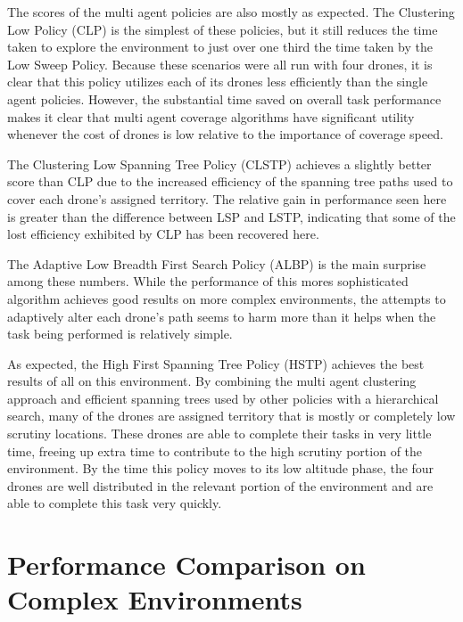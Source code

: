 The scores of the multi agent policies are also mostly as expected. The Clustering Low Policy (CLP) is the simplest of these policies, but it still reduces the time taken to explore the environment to just over one third the time taken by the Low Sweep Policy. Because these scenarios were all run with four drones, it is clear that this policy utilizes each of its drones less efficiently than the single agent policies. However, the substantial time saved on overall task performance makes it clear that multi agent coverage algorithms have significant utility whenever the cost of drones is low relative to the importance of coverage speed.

The Clustering Low Spanning Tree Policy (CLSTP) achieves a slightly better score than CLP due to the increased efficiency of the spanning tree paths used to cover each drone's assigned territory. The relative gain in performance seen here is greater than the difference between LSP and LSTP, indicating that some of the lost efficiency exhibited by CLP has been recovered here. 

The Adaptive Low Breadth First Search Policy (ALBP) is the main surprise among these numbers. While the performance of this mores sophisticated algorithm achieves good results on more complex environments, the attempts to adaptively alter each drone's path seems to harm more than it helps when the task being performed is relatively simple.

As expected, the High First Spanning Tree Policy (HSTP) achieves the best results of all on this environment. By combining the multi agent clustering approach and efficient spanning trees used by other policies with a hierarchical search, many of the drones are assigned territory that is mostly or completely low scrutiny locations. These drones are able to complete their tasks in very little time, freeing up extra time to contribute to the high scrutiny portion of the environment. By the time this policy moves to its low altitude phase, the four drones are well distributed in the relevant portion of the environment and are able to complete this task very quickly.

\section{Performance Comparison on Complex Environments}

